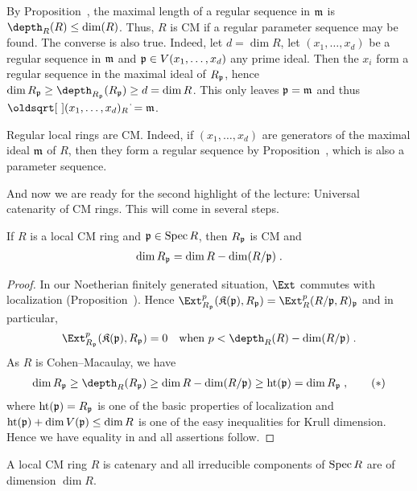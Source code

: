 \documentclass[a4paper,parskip=half,numbers=enddot, DIV=12]{scrreprt}
\begin{document}
By Proposition~, the maximal length of a regular sequence in $\mathfrak{m}$ is $\depth_R(R)\leq\dim(R)$. Thus, $R$ is CM if a regular parameter sequence may be found. The converse is also true. Indeed, let $d=\dim R$, let $(x_1,\ldots,x_d)$ be a regular sequence in $\mathfrak{m}$ and $\mathfrak{p}\in V(x_1,\ldots,x_d)$ any prime ideal. Then the $x_i$ form a regular sequence in the maximal ideal of $R_{\mathfrak{p}}$, hence $\dim R_\pp\geq\depth_{R_\pp}(R_\pp)\geq d=\dim R$. This only leaves $\mathfrak{p}=\mathfrak{m}$ and thus $\sqrt{(x_1,\ldots,x_d)_R}=\mm$.
\begin{example}
	Regular local rings are CM. Indeed, if $(x_1,\ldots,x_d)$ are generators of the maximal ideal $\mathfrak{m}$ of $R$, then they form a regular sequence by Proposition~, which is also a parameter sequence.
\end{example}
And now we are ready for the second highlight of the lecture: Universal catenarity of CM rings. This will come in several steps.
\begin{prop}
	If $R$ is a local CM ring and $\mathfrak{p}\in\operatorname{Spec} R$, then $R_{\mathfrak{p}}$ is CM and
	\begin{align*}
		\dim R_{\mathfrak{p}}=\dim R-\dim (R/\mathfrak{p})\;.
	\end{align*}
\end{prop}
\begin{proof}
	In our Noetherian finitely generated situation, $\Ext$ commutes with localization (Proposition~). Hence $\Ext_{R_\pp}^p(\KK(\pp),R_\pp)=\Ext_R^p(R/\pp,R)_\pp$ and in particular,
	\begin{align*}
		\Ext_{R_\pp}^p(\KK(\pp),R_\pp)=0\quad\text{when }p<\depth_R(R)-\dim(R/\pp)\;.
	\end{align*}
	As $R$ is Cohen--Macaulay, we have
	\begin{align}\lbl{eq:dimRp}
		\dim R_\pp\geq\depth_R(R_\pp)\geq \dim R-\dim(R/\pp)\geq\hoehe(\pp)=\dim R_\pp\;,\tag{$*$}
	\end{align}
	where $\operatorname{ht}(\mathfrak{p})=R_{\mathfrak{p}}$ is one of the basic properties of localization and $\operatorname{ht}(\mathfrak{p})+\dim V(\mathfrak{p})\leq \dim R$ is one of the easy inequalities for Krull dimension. Hence we have equality in  and all assertions follow.
\end{proof}
\begin{cor}
	A local CM ring $R$ is catenary and all irreducible components of $\operatorname{Spec} R$ are of dimension $\dim R$.
\end{cor}
\end{document}
